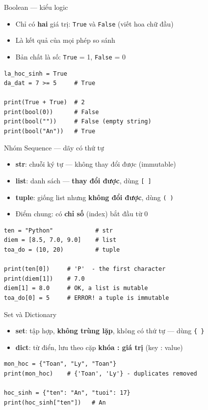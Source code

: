 \documentclass[11pt]{beamer}
\begin{document}
\begin{frame}[fragile]{Boolean — kiểu logic}
\begin{itemize}
  \item Chỉ có \textbf{hai} giá trị: \texttt{True} và \texttt{False} (viết hoa chữ đầu)
  \item Là kết quả của mọi phép so sánh
  \item Bản chất là số: \texttt{True} = 1, \texttt{False} = 0
\end{itemize}
\begin{lstlisting}
la_hoc_sinh = True
da_dat = 7 >= 5     # True

print(True + True)  # 2
print(bool(0))      # False
print(bool(""))     # False (empty string)
print(bool("An"))   # True
\end{lstlisting}
\end{frame}

\begin{frame}[fragile]{Nhóm Sequence — dãy có thứ tự}
\begin{itemize}
  \item \textbf{str}: chuỗi ký tự — không thay đổi được (immutable)
  \item \textbf{list}: danh sách — \textbf{thay đổi được}, dùng \texttt{[ ]}
  \item \textbf{tuple}: giống list nhưng \textbf{không đổi được}, dùng \texttt{( )}
  \item Điểm chung: có \textbf{chỉ số} (index) bắt đầu từ 0
\end{itemize}
\begin{lstlisting}
ten = "Python"            # str
diem = [8.5, 7.0, 9.0]    # list
toa_do = (10, 20)         # tuple

print(ten[0])     # 'P'  - the first character
print(diem[1])    # 7.0
diem[1] = 8.0     # OK, a list is mutable
toa_do[0] = 5     # ERROR! a tuple is immutable
\end{lstlisting}
\end{frame}

\begin{frame}[fragile]{Set và Dictionary}
\begin{itemize}
  \item \textbf{set}: tập hợp, \textbf{không trùng lặp}, không có thứ tự — dùng \texttt{\{ \}}
  \item \textbf{dict}: từ điển, lưu theo cặp \textbf{khóa : giá trị} (key : value)
\end{itemize}
\begin{lstlisting}
mon_hoc = {"Toan", "Ly", "Toan"}
print(mon_hoc)    # {'Toan', 'Ly'} - duplicates removed

hoc_sinh = {"ten": "An", "tuoi": 17}
print(hoc_sinh["ten"])   # An
\end{lstlisting}
\end{frame}
\end{document}
